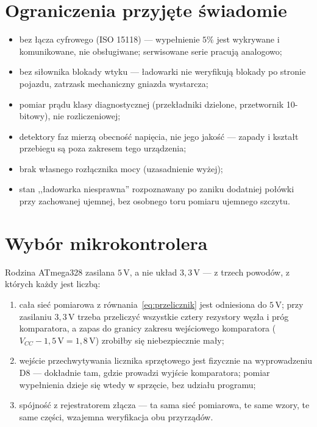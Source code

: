 \documentclass[a4paper,11pt]{article}
\newcommand{\volt}{\,\mathrm{V}}
\begin{document}
\section{Ograniczenia przyjęte świadomie}

\begin{itemize}
\item bez łącza cyfrowego (ISO 15118) --- wypełnienie $5\%$ jest wykrywane
      i komunikowane, nie obsługiwane; serwisowane serie pracują analogowo;
\item bez siłownika blokady wtyku --- ładowarki nie weryfikują blokady po stronie
      pojazdu, zatrzask mechaniczny gniazda wystarcza;
\item pomiar prądu klasy diagnostycznej (przekładniki dzielone, przetwornik
      10-bitowy), nie rozliczeniowej;
\item detektory faz mierzą obecność napięcia, nie jego jakość --- zapady i kształt
      przebiegu są poza zakresem tego urządzenia;
\item brak własnego rozłącznika mocy (uzasadnienie wyżej);
\item stan ,,ładowarka niesprawna'' rozpoznawany po zaniku dodatniej połówki przy
      zachowanej ujemnej, bez osobnego toru pomiaru ujemnego szczytu.
\end{itemize}

\section{Wybór mikrokontrolera}

Rodzina ATmega328 zasilana $5\volt$, a nie układ $3{,}3\volt$ --- z trzech powodów,
z których każdy jest liczbą:

\begin{enumerate}
\item cała sieć pomiarowa z równania~\eqref{eq:przelicznik} jest odniesiona do
      $5\volt$; przy zasilaniu $3{,}3\volt$ trzeba przeliczyć wszystkie cztery
      rezystory węzła i próg komparatora, a zapas do granicy zakresu wejściowego
      komparatora ($V_{CC}-1{,}5\volt = 1{,}8\volt$) zrobiłby się niebezpiecznie
      mały;
\item wejście przechwytywania licznika sprzętowego jest fizycznie na wyprowadzeniu
      D8 --- dokładnie tam, gdzie prowadzi wyjście komparatora; pomiar wypełnienia
      dzieje się wtedy w sprzęcie, bez udziału programu;
\item spójność z rejestratorem złącza --- ta sama sieć pomiarowa, te same wzory,
      te same części, wzajemna weryfikacja obu przyrządów.
\end{enumerate}
\end{document}
